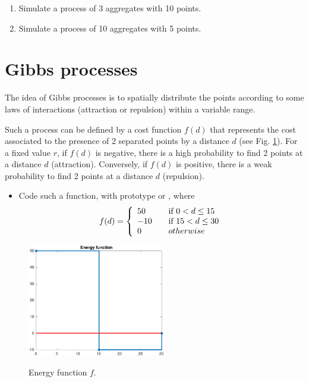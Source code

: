 \begin{qbox}
\begin{enumerate}
	\item Simulate a process of 3 aggregates with 10 points.
	\item Simulate a process of 10 aggregates with 5 points.
\end{enumerate}
\end{qbox}

\section{Gibbs processes}
The idea of Gibbs processes is to spatially distribute the points according to some laws of interactions (attraction or repulsion) within a 
variable range. 

Such a process can be defined by a cost function $f(d)$ that represents the cost associated to the presence of 2 separated points by a 
distance $d$ (see Fig. \ref{fig:point_process_generation:energyfunction}). For a fixed value $r$, if $f(d)$ is negative, there is a high 
probability to find 2 points 
at a distance $d$ (attraction). Conversely, if $f(d)$ is positive, there is a weak probability to find 2 points at a distance $d$ 
(repulsion).



\begin{itemize}
 \item Code such a function, with prototype  or , where
 \[ f(d) = \left\{ 
  \begin{array}{l l}
    50 & \quad \text{if $0<d\leq 15$ }\\
    -10 & \quad \text{if $15<d\leq 30$}\\
    0 & \quad otherwise
  \end{array} \right.\]
\end{itemize}
\begin{figure}[htbp]
 \centering\caption{Energy function $f$.}%
 \includegraphics[width=6cm]{../matlab/energy.pdf}%
 \label{fig:point_process_generation:energyfunction}%
\end{figure}

